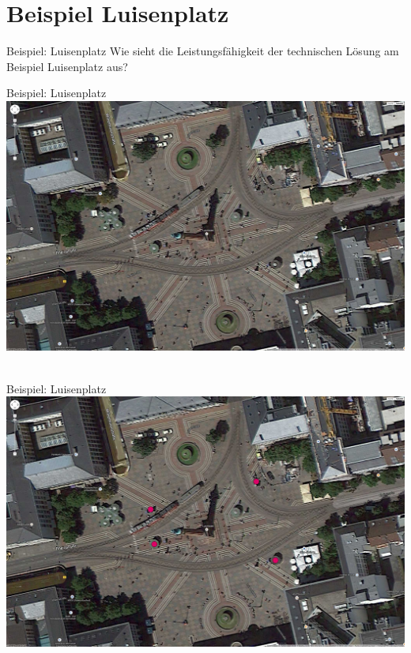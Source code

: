 \documentclass{beamer}
\begin{document}
\section{Beispiel Luisenplatz}
\begin{frame}{Beispiel: Luisenplatz}
Wie sieht die Leistungsfähigkeit der technischen Lösung am Beispiel Luisenplatz aus?
\end{frame}

\begin{frame}{Beispiel: Luisenplatz}
\includegraphics[height=0.75\textheight]{images/map_luisenplatz_1.jpg}$\;$
\end{frame}

\begin{frame}{Beispiel: Luisenplatz}
\includegraphics[height=0.75\textheight]{images/map_luisenplatz_2.jpg}$\;$
\end{frame}
\end{document}
